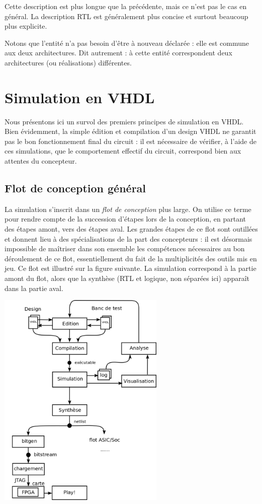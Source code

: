 Cette description est plus longue que la précédente, mais ce n'est pas le cas en général. La description RTL est généralement plus concise et surtout beaucoup plus explicite.

Notons que l'entité n'a pas besoin d'être à nouveau déclarée : elle est commune aux deux architectures. Dit autrement : à cette entité correspondent deux architectures (ou réalisations) différentes.

\section{Simulation en VHDL}

Nous présentons ici un survol des premiers principes de simulation en VHDL. Bien évidemment, la simple édition et compilation d'un design VHDL ne garantit
pas le bon fonctionnement final du circuit : il est nécessaire de vérifier, à l'aide de ces simulations, que le comportement effectif du circuit, correspond
bien aux attentes du concepteur.

\subsection{Flot de conception général}

La simulation s'inscrit dans un {\it flot de conception} plus large. On utilise ce terme pour rendre compte de la succession d'étapes lors de la conception,
en partant des étapes amont, vers des étapes aval. Les grandes étapes de ce flot sont outillées et donnent lieu à des spécialisations de la part
des concepteurs : il est désormais impossible de maîtriser dans son ensemble les compétences nécessaires au bon déroulement de ce flot, essentiellement du fait
de la multiplicités des outils mis en jeu. Ce flot est illustré sur la figure suivante. La simulation correspond à la partie amont du flot, alors que la synthèse (RTL et logique, non séparées ici)
apparaît dans la partie aval.

\begin{center}
\begin{minipage}[t]{8cm}
 \centering
 \includegraphics[width=8cm]{./figures/conception_generale.png}
\end{minipage}
\end{center}


